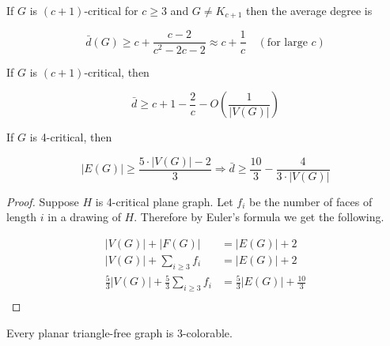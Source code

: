\begin{thm}
	If $G$ is $(c+1)$-critical for $c \geq 3$ and $G \neq K_{c+1}$ then the average degree is
	
	$$
	\bar{d}(G) \geq c + \frac{c-2}{c^2 - 2c -2} \approx c + \frac{1}{c} \quad (\text{for large } c)
	$$
\end{thm}

\begin{thm}
	If $G$ is $(c+1)$-critical, then
	
	$$
	\bar{d} \geq c+1 - \frac{2}{c} - O\left( \frac{1}{|V(G)|}\right)
	$$
\end{thm}

\begin{thm}
	If $G$ is 4-critical, then
	
	$$
	|E(G)| \geq \frac{5 \cdot |V(G)| - 2}{3} \Rightarrow \bar{d} \geq \frac{10}{3} - \frac{4}{3 \cdot |V(G)|}
	$$
\end{thm}

\begin{proof}
	Suppose $H$ is 4-critical plane graph. Let $f_i$ be the number of faces of length $i$ in a drawing of $H$. Therefore by Euler's formula we get the following.
	
	$$
	\begin{aligned}
		|V(G)| + |F(G)| &= |E(G)| + 2 \\
		|V(G)| + \sum_{i \geq 3} f_i &= |E(G)| + 2 \\
		\frac{5}{3}|V(G)| + \frac{5}{3}\sum_{i \geq 3} f_i &= \frac{5}{3}|E(G)| + \frac{10}{3} \\
	\end{aligned}
	$$
\end{proof}

\begin{thm}[Grötsch]
	Every planar triangle-free graph is 3-colorable.
\end{thm}